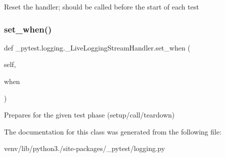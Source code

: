 \begin{DoxyVerb}Reset the handler; should be called before the start of each test\end{DoxyVerb}
 \mbox{\label{class__pytest_1_1logging_1_1___live_logging_stream_handler_a78eaedf1bf9dec22a47f94a41730b83c}} 
\subsubsection{\texorpdfstring{set\+\_\+when()}{set\_when()}}
{\footnotesize\ttfamily def \+\_\+pytest.\+logging.\+\_\+\+Live\+Logging\+Stream\+Handler.\+set\+\_\+when (\begin{DoxyParamCaption}\item[{}]{self,  }\item[{}]{when }\end{DoxyParamCaption})}

\begin{DoxyVerb}Prepares for the given test phase (setup/call/teardown)\end{DoxyVerb}
 

The documentation for this class was generated from the following file\+:\begin{DoxyCompactItemize}
\item 
venv/lib/python3./site-\/packages/\+\_\+pytest/logging.\+py\end{DoxyCompactItemize}
